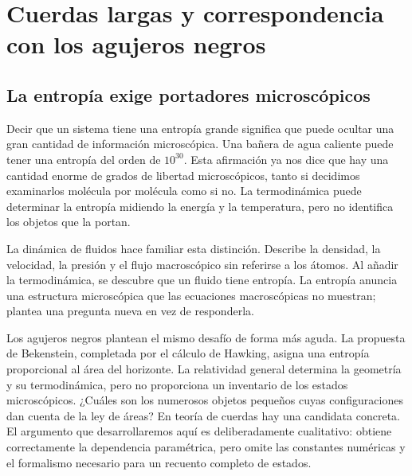 \chapter{Cuerdas largas y correspondencia con los agujeros negros}


\section{La entropía exige portadores microscópicos}

Decir que un sistema tiene una entropía grande significa que puede ocultar una gran cantidad de información microscópica. Una bañera de agua caliente puede tener una entropía del orden de \(10^{30}\). Esta afirmación ya nos dice que hay una cantidad enorme de grados de libertad microscópicos, tanto si decidimos examinarlos molécula por molécula como si no. La termodinámica puede determinar la entropía midiendo la energía y la temperatura, pero no identifica los objetos que la portan.

La dinámica de fluidos hace familiar esta distinción. Describe la densidad, la velocidad, la presión y el flujo macroscópico sin referirse a los átomos. Al añadir la termodinámica, se descubre que un fluido tiene entropía. La entropía anuncia una estructura microscópica que las ecuaciones macroscópicas no muestran; plantea una pregunta nueva en vez de responderla.

Los agujeros negros plantean el mismo desafío de forma más aguda. La propuesta de Bekenstein, completada por el cálculo de Hawking, asigna una entropía proporcional al área del horizonte. La relatividad general determina la geometría y su termodinámica, pero no proporciona un inventario de los estados microscópicos. ¿Cuáles son los numerosos objetos pequeños cuyas configuraciones dan cuenta de la ley de áreas? En teoría de cuerdas hay una candidata concreta. El argumento que desarrollaremos aquí es deliberadamente cualitativo: obtiene correctamente la dependencia paramétrica, pero omite las constantes numéricas y el formalismo necesario para un recuento completo de estados.

